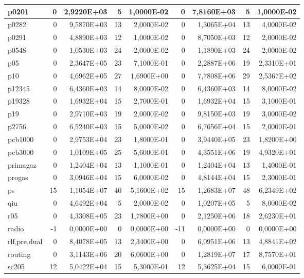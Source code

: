\begin{tabular}{|l|r|r|r|r|r|r|r|r|}
p0201 & 0 & 2,9220E+03 & 5 & 1,0000E-02 & 0 & 7,8160E+03 & 5 & 1,0000E-02 \\ \hline
p0282 & 0 & 9,5870E+03 & 13 & 2,0000E-02 & 0 & 1,3065E+04 & 13 & 4,0000E-02 \\ \hline
p0291 & 0 & 4,8890E+03 & 12 & 1,0000E-02 & 0 & 8,7050E+03 & 12 & 2,0000E-02 \\ \hline
p0548 & 0 & 1,0530E+03 & 24 & 2,0000E-02 & 0 & 1,1890E+03 & 24 & 2,0000E-02 \\ \hline
p05 & 0 & 2,3647E+05 & 23 & 7,1000E-01 & 0 & 2,2887E+06 & 19 & 2,3310E+01 \\ \hline
p10 & 0 & 4,6962E+05 & 27 & 1,6900E+00 & 0 & 7,7808E+06 & 29 & 2,5367E+02 \\ \hline
p12345 & 0 & 6,4360E+03 & 14 & 8,0000E-02 & 0 & 6,4360E+03 & 14 & 8,0000E-02 \\ \hline
p19328 & 0 & 1,6932E+04 & 15 & 2,7000E-01 & 0 & 1,6932E+04 & 15 & 3,1000E-01 \\ \hline
p19 & 0 & 2,9710E+03 & 19 & 2,0000E-02 & 0 & 9,8150E+03 & 19 & 3,0000E-02 \\ \hline
p2756 & 0 & 6,5240E+03 & 15 & 5,0000E-02 & 0 & 6,7656E+04 & 15 & 2,0000E-01 \\ \hline
pcb1000 & 0 & 2,9753E+04 & 23 & 1,8000E-01 & 0 & 3,9440E+05 & 23 & 1,8200E+00 \\ \hline
pcb3000 & 0 & 1,0109E+05 & 25 & 5,6000E-01 & 0 & 4,3551E+06 & 19 & 4,9320E+01 \\ \hline
primagaz & 0 & 1,2404E+04 & 13 & 1,1000E-01 & 0 & 1,2404E+04 & 13 & 1,4000E-01 \\ \hline
progas & 0 & 3,0946E+04 & 15 & 6,0000E-02 & 0 & 4,8144E+04 & 15 & 2,3000E-01 \\ \hline
ps & 15 & 1,1054E+07 & 40 & 5,1600E+02 & 15 & 1,2683E+07 & 48 & 6,2349E+02 \\ \hline
qiu & 0 & 4,6492E+04 & 5 & 2,0000E-02 & 0 & 1,0207E+05 & 5 & 8,0000E-02 \\ \hline
r05 & 0 & 4,3308E+05 & 23 & 1,7800E+00 & 0 & 2,1250E+06 & 18 & 2,6230E+01 \\ \hline
radio & -1 & 0,0000E+00 & 0 & 0,0000E+00 & -11 & 0,0000E+00 & 0 & 0,0000E+00 \\ \hline
rlf,pre,dual & 0 & 8,4078E+05 & 13 & 2,3400E+00 & 0 & 6,0951E+06 & 13 & 4,8841E+02 \\ \hline
routing & 0 & 3,1143E+06 & 20 & 6,0600E+00 & 0 & 1,2819E+07 & 17 & 8,7570E+01 \\ \hline
sc205 & 12 & 5,0422E+04 & 15 & 5,3000E-01 & 12 & 5,3625E+04 & 15 & 6,0000E-01 \\ \hline

\end{tabular}
